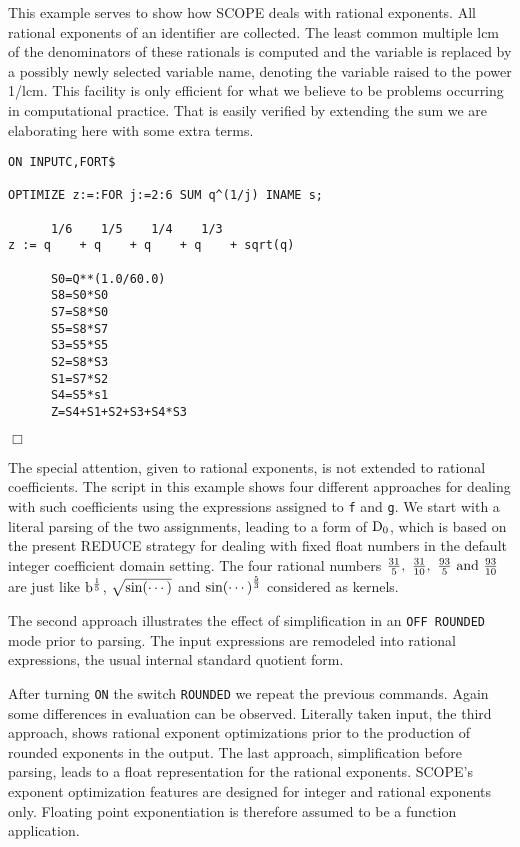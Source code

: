 This example serves to show how SCOPE deals with rational 
exponents.  All rational exponents of an identifier are collected. 
The least common
multiple lcm of the denominators of these rationals is
computed and the variable is replaced by a possibly newly selected
variable name, denoting the variable raised to the power 1/lcm. This
facility is only efficient for what we believe to be problems
occurring in computational practice. That is easily verified by
extending the sum we are elaborating here with some extra terms.
\newpage
{\small
\begin{verbatim}
ON INPUTC,FORT$

OPTIMIZE z:=:FOR j:=2:6 SUM q^(1/j) INAME s;

      1/6    1/5    1/4    1/3
z := q    + q    + q    + q    + sqrt(q)

      S0=Q**(1.0/60.0)
      S8=S0*S0
      S7=S8*S0
      S5=S8*S7
      S3=S5*S5
      S2=S8*S3
      S1=S7*S2
      S4=S5*s1
      Z=S4+S1+S2+S3+S4*S3
\end{verbatim}
\begin{flushright}
$\Box$
\end{flushright}}
\example\label{ex:3.1.7}

The special attention, given to rational exponents, is not extended to 
rational coefficients. The script in this example shows four different 
approaches for dealing with such coefficients using the expressions assigned to
{\tt f} and {\tt g}. We start with a literal parsing of the two assignments,
leading to a form of ${\rm D}_0$, which is  based on the present REDUCE 
strategy for dealing with fixed float numbers in the default integer 
coefficient domain setting.
The four rational numbers $\frac{31}{5} ,~ \frac{31}{10} ,~\frac{93}{5}~
{\rm and}~\frac{93}{10}$ are just like ${\rm b}^{\frac{1}{5}}$, $\sqrt {\rm 
sin(\cdots)}$ and ${\rm sin(\cdots)}^{\frac{5}{3}}$ considered as kernels.

The second approach illustrates the effect of simplification in 
an {\tt OFF ROUNDED} mode prior to parsing. The input expressions are 
remodeled into rational expressions, the usual internal standard quotient form.

After turning {\tt ON} the switch  {\tt ROUNDED}  we repeat the previous 
commands. Again some differences in evaluation can be observed. Literally
taken input, the third approach,  shows rational exponent optimizations
prior to the production of rounded exponents in the output.
The last approach, simplification before parsing, leads to a float 
representation for the rational exponents. SCOPE's exponent optimization
features are designed for integer and rational exponents only. Floating
point exponentiation is therefore assumed to be a function application.

